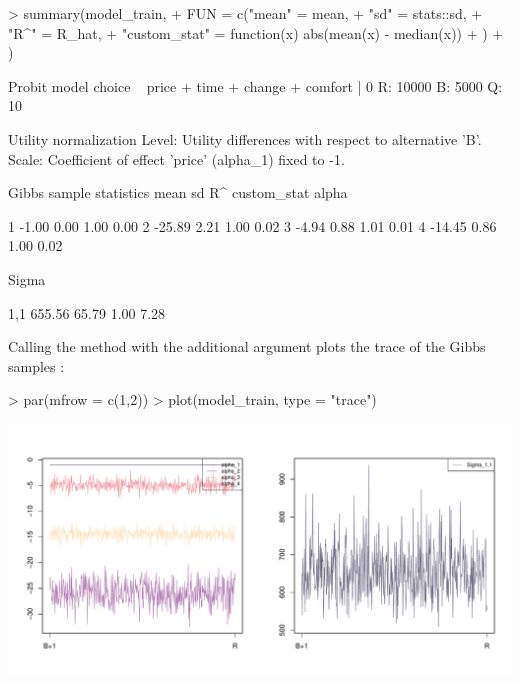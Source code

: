 \documentclass[article]{jss}
\newcommand{\fct}[1]{\code{#1()}}
\begin{document}
\begin{Schunk}
\begin{Sinput}
> summary(model_train,
+          FUN = c("mean"        = mean,
+                  "sd"          = stats::sd,
+                  "R^"          = R_hat,
+                  "custom_stat" = function(x) abs(mean(x) - median(x))
+                  )
+         )
\end{Sinput}
\begin{Soutput}
Probit model
choice ~ price + time + change + comfort | 0 
R: 10000 
B: 5000 
Q: 10 

Utility normalization
Level: Utility differences with respect to alternative 'B'.
Scale: Coefficient of effect 'price' (alpha_1) fixed to -1.

Gibbs sample statistics
               mean           sd           R^  custom_stat
 alpha
                                                          
     1        -1.00         0.00         1.00         0.00
     2       -25.89         2.21         1.00         0.02
     3        -4.94         0.88         1.01         0.01
     4       -14.45         0.86         1.00         0.02

 Sigma
                                                          
   1,1       655.56        65.79         1.00         7.28
\end{Soutput}
\end{Schunk}

Calling the \fct{plot} method with the additional argument  plots the trace of the Gibbs samples :

\begin{Schunk}
\begin{Sinput}
> par(mfrow = c(1,2))
> plot(model_train, type = "trace")
\end{Sinput}
\end{Schunk}
\includegraphics{rprobitb_oelschlaeger_bauer-model-train-trace}
\end{document}
